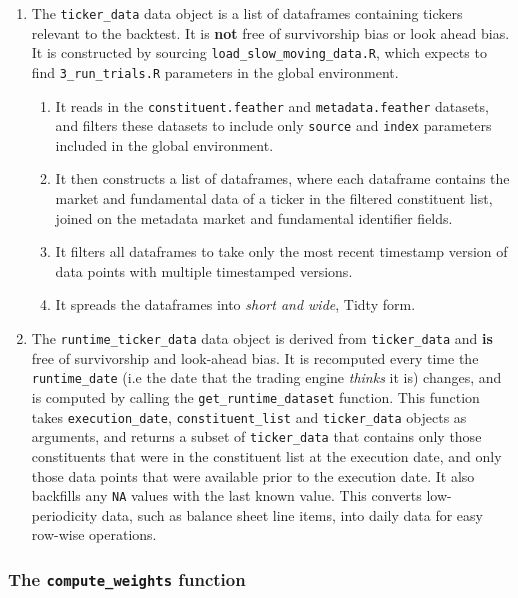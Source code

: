 \documentclass[11pt,preprint, authoryear]{elsarticle}
\numberwithin{equation}{section}
\numberwithin{figure}{section}
\numberwithin{table}{section}
\def\tightlist{} %
\begin{document}
\begin{enumerate}
\def\labelenumi{\arabic{enumi}.}
\tightlist
\item
  The \texttt{ticker\_data} data object is a list of dataframes
  containing tickers relevant to the backtest. It is \textbf{not} free
  of survivorship bias or look ahead bias. It is constructed by sourcing
  \texttt{load\_slow\_moving\_data.R}, which expects to find
  \texttt{3\_run\_trials.R} parameters in the global environment.

  \begin{enumerate}
  \def\labelenumii{\arabic{enumii}.}
  \tightlist
  \item
    It reads in the \texttt{constituent.feather} and
    \texttt{metadata.feather} datasets, and filters these datasets to
    include only \texttt{source} and \texttt{index} parameters included
    in the global environment.
  \item
    It then constructs a list of dataframes, where each dataframe
    contains the market and fundamental data of a ticker in the filtered
    constituent list, joined on the metadata market and fundamental
    identifier fields.
  \item
    It filters all dataframes to take only the most recent timestamp
    version of data points with multiple timestamped versions.
  \item
    It spreads the dataframes into \emph{short and wide}, Tidty form.
  \end{enumerate}
\item
  The \texttt{runtime\_ticker\_data} data object is derived from
  \texttt{ticker\_data} and \textbf{is} free of survivorship and
  look-ahead bias. It is recomputed every time the
  \texttt{runtime\_date} (i.e the date that the trading engine
  \emph{thinks} it is) changes, and is computed by calling the
  \texttt{get\_runtime\_dataset} function. This function takes
  \texttt{execution\_date}, \texttt{constituent\_list} and
  \texttt{ticker\_data} objects as arguments, and returns a subset of
  \texttt{ticker\_data} that contains only those constituents that were
  in the constituent list at the execution date, and only those data
  points that were available prior to the execution date. It also
  backfills any \texttt{NA} values with the last known value. This
  converts low-periodicity data, such as balance sheet line items, into
  daily data for easy row-wise operations.
\end{enumerate}

\subsubsection{\texorpdfstring{The \texttt{compute\_weights}
function}{The compute\_weights function}}\label{the-compute_weights-function}
\end{document}
